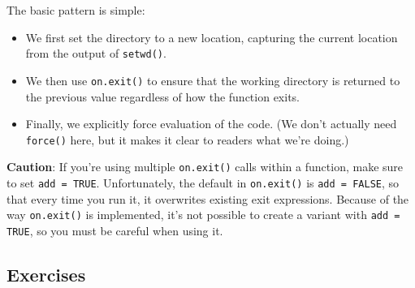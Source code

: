 \begin{Shaded}
\begin{Highlighting}[]
\StringTok{ }
  \StringTok{ }
  \NormalTok{(}

\NormalTok{\}}
\NormalTok{()}
\NormalTok{(}\NormalTok{, }\NormalTok{())}
\end{Highlighting}
\end{Shaded}

The basic pattern is simple:

\begin{itemize}
\item
  We first set the directory to a new location, capturing the current
  location from the output of \texttt{setwd()}.
\item
  We then use \texttt{on.exit()} to ensure that the working directory is
  returned to the previous value regardless of how the function exits.
\item
  Finally, we explicitly force evaluation of the code. (We don't
  actually need \texttt{force()} here, but it makes it clear to readers
  what we're doing.)
\end{itemize}

\textbf{Caution}: If you're using multiple \texttt{on.exit()} calls
within a function, make sure to set \texttt{add = TRUE}. Unfortunately,
the default in \texttt{on.exit()} is \texttt{add = FALSE}, so that every
time you run it, it overwrites existing exit expressions. Because of the
way \texttt{on.exit()} is implemented, it's not possible to create a
variant with \texttt{add = TRUE}, so you must be careful when using it.

\subsection{Exercises}

